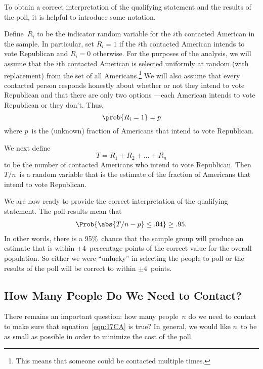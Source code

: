 \begin{editingnotes}
To obtain a correct interpretation of the qualifying statement and the
results of the poll, it is helpful to introduce some notation.

Define~$R_i$ to be the indicator random variable for the $i$th
contacted American in the sample.  In particular, set $R_i = 1$ if the
$i$th contacted American intends to vote Republican and $R_i = 0$
otherwise.  For the purposes of the analysis, we will assume that the
$i$th contacted American is selected uniformly at random (with
replacement) from the set of all Americans.\footnote{This means that
someone could be contacted multiple times.}  We will also assume
that every contacted person responds honestly about whether or not
they intend to vote Republican and that there are only two
options ---each American intends to vote Republican or they don't.
Thus,
\begin{equation}
    \prob{R_i = 1} = p
\end{equation}
where $p$~is the (unknown) fraction of Americans that intend to vote
Republican.

We next define
\begin{equation*}
    T = R_1 + R_2 + \dots + R_n
\end{equation*}
to be the number of contacted Americans who intend to vote
Republican.  Then $T/n$~is a random variable that is the estimate of
the fraction of Americans that intend to vote Republican.

We are now ready to provide the correct interpretation of the
qualifying statement.  The poll results mean that
\begin{equation}\label{eqn:17CA}
    \Prob{\strut \abs{T/n - p} \le .04} \ge .95.
\end{equation}
In other words, there is a 95\%~chance that the sample group will
produce an estimate that is within $\pm 4$~percentage points of the
correct value for the overall population.  So either we were
``unlucky'' in selecting the people to poll or the results of the poll
will be correct to within $\pm 4$~points.

\subsection{How Many People Do We Need to Contact?}

There remains an important question: how many people~$n$ do we need to
contact to make sure that equation~\eqref{eqn:17CA} is true?  In
general, we would like $n$~to be as small as possible in order to
minimize the cost of the poll.


\end{editingnotes}
